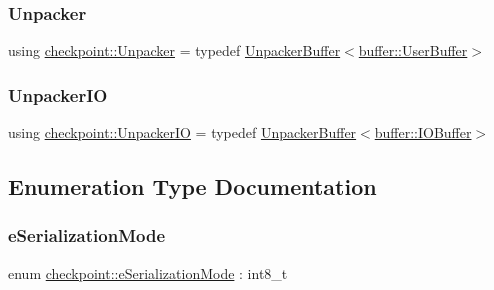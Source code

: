 \mbox{\label{namespacecheckpoint_af36cfec8b3ef7476bb97b3b12908370d}} 
\subsubsection{\texorpdfstring{Unpacker}{Unpacker}}
{\footnotesize\ttfamily using \hyperlink{namespacecheckpoint_af36cfec8b3ef7476bb97b3b12908370d}{checkpoint\+::\+Unpacker} = typedef \hyperlink{structcheckpoint_1_1_unpacker_buffer}{Unpacker\+Buffer}$<$\hyperlink{structcheckpoint_1_1buffer_1_1_user_buffer}{buffer\+::\+User\+Buffer}$>$}

\mbox{\label{namespacecheckpoint_a0efc06d99dce79e452b9d1b503059a74}} 
\subsubsection{\texorpdfstring{Unpacker\+IO}{UnpackerIO}}
{\footnotesize\ttfamily using \hyperlink{namespacecheckpoint_a0efc06d99dce79e452b9d1b503059a74}{checkpoint\+::\+Unpacker\+IO} = typedef \hyperlink{structcheckpoint_1_1_unpacker_buffer}{Unpacker\+Buffer}$<$\hyperlink{structcheckpoint_1_1buffer_1_1_i_o_buffer}{buffer\+::\+I\+O\+Buffer}$>$}



\subsection{Enumeration Type Documentation}
\mbox{\label{namespacecheckpoint_ae2509499ccd8b1dc48fb535bf8aa3059}} 
\subsubsection{\texorpdfstring{e\+Serialization\+Mode}{eSerializationMode}}
{\footnotesize\ttfamily enum \hyperlink{namespacecheckpoint_ae2509499ccd8b1dc48fb535bf8aa3059}{checkpoint\+::e\+Serialization\+Mode} \+: int8\+\_\+t\hspace{0.3cm}{\ttfamily [strong]}}

